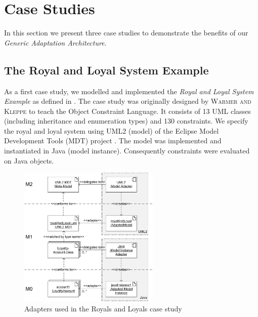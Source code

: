\section{Case Studies}
\label{sec:caseStudies}
In this section we present three case studies to demonstrate the benefits of our
\emph{Generic Adaptation Architecture}.


\subsection{The Royal and Loyal System Example}

As a first case study, we modelled and implemented the \textit{Royal and Loyal System Example} 
as defined in \cite{warmer:ocl}. The case study was originally designed by \textsc{Warmer
and Kleppe} to teach the Object Constraint Language. It consists of
13 UML classes (including inheritance and enumeration types) and 130 constraints. 
We specify the royal and loyal system using UML2 (model) of the
Eclipse Model Development Tools (MDT) project \cite{WWW:MDT}.
The model was implemented and instantiated in Java (model instance).
Consequently constraints were evaluated on Java objects.

\begin{figure}[!t]
	\centering
		\includegraphics[width=0.60\textwidth]{figures/casestudy01.pdf}
	\caption{
	Adapters used in the Royals and Loyals case study
	  }
	\label{fig:casestudy01}
\end{figure}


